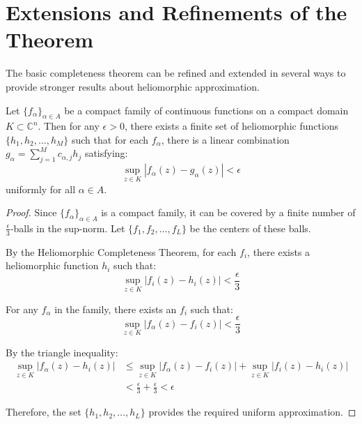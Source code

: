 \section{Extensions and Refinements of the Theorem}

The basic completeness theorem can be refined and extended in several ways to provide stronger results about heliomorphic approximation.

\begin{theorem}
Let $\{f_{\alpha}\}_{\alpha \in A}$ be a compact family of continuous functions on a compact domain $K \subset \mathbb{C}^n$. Then for any $\epsilon > 0$, there exists a finite set of heliomorphic functions $\{h_1, h_2, \ldots, h_M\}$ such that for each $f_{\alpha}$, there is a linear combination $g_{\alpha} = \sum_{j=1}^{M} c_{\alpha,j}h_j$ satisfying:
\begin{equation}
\sup_{z \in K} |f_{\alpha}(z) - g_{\alpha}(z)| < \epsilon
\end{equation}
uniformly for all $\alpha \in A$.
\end{theorem}

\begin{proof}
Since $\{f_{\alpha}\}_{\alpha \in A}$ is a compact family, it can be covered by a finite number of $\frac{\epsilon}{3}$-balls in the sup-norm. Let $\{f_1, f_2, \ldots, f_L\}$ be the centers of these balls.

By the Heliomorphic Completeness Theorem, for each $f_i$, there exists a heliomorphic function $h_i$ such that:
\begin{equation}
\sup_{z \in K} |f_i(z) - h_i(z)| < \frac{\epsilon}{3}
\end{equation}

For any $f_{\alpha}$ in the family, there exists an $f_i$ such that:
\begin{equation}
\sup_{z \in K} |f_{\alpha}(z) - f_i(z)| < \frac{\epsilon}{3}
\end{equation}

By the triangle inequality:
\begin{align}
\sup_{z \in K} |f_{\alpha}(z) - h_i(z)| &\leq \sup_{z \in K} |f_{\alpha}(z) - f_i(z)| + \sup_{z \in K} |f_i(z) - h_i(z)|\\
&< \frac{\epsilon}{3} + \frac{\epsilon}{3} < \epsilon
\end{align}

Therefore, the set $\{h_1, h_2, \ldots, h_L\}$ provides the required uniform approximation.
\end{proof}

